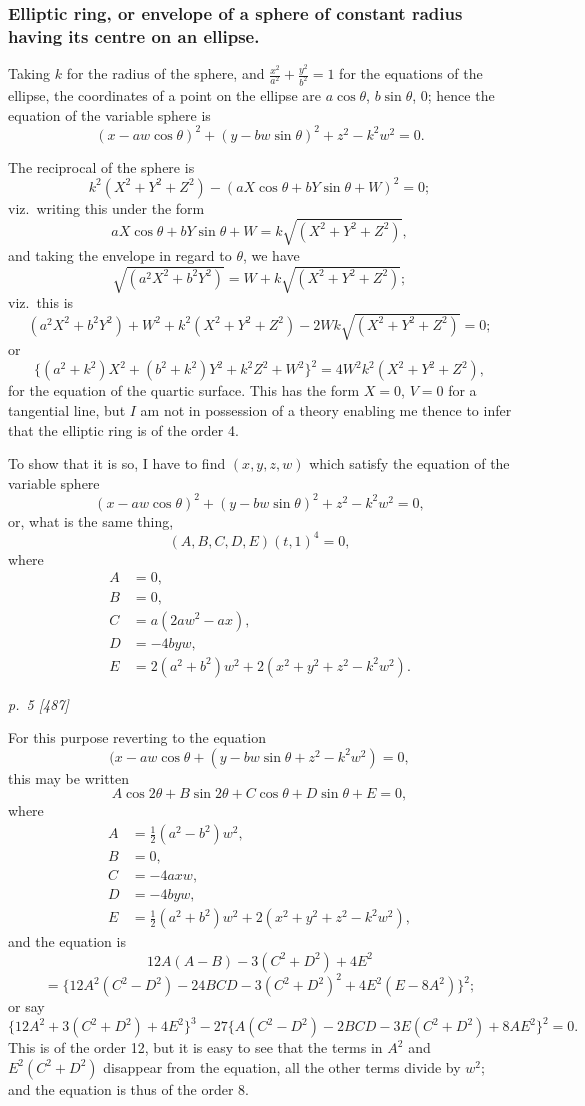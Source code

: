 \documentclass[11pt,a4paper]{article}
\theoremstyle{plain}
\theoremstyle{definition}
\begin{document}
\subsubsection*{Elliptic ring, or envelope of a sphere of constant radius having its centre on an ellipse.}

Taking $k$ for the radius of the sphere, and $\frac{x^2}{a^2} + \frac{y^2}{b^2} = 1$ for the equations of
the ellipse, the coordinates of a point on the ellipse are $a\cos\theta$, $b\sin\theta$, $0$; hence the
equation of the variable sphere is
\[
(x - aw\cos\theta)^2 + (y - bw\sin\theta)^2 + z^2 - k^2 w^2 = 0.
\]

The reciprocal of the sphere is
\[
k^2 (X^2 + Y^2 + Z^2) - (aX\cos\theta + bY\sin\theta + W)^2 = 0;
\]
viz.\ writing this under the form
\[
aX\cos\theta + bY\sin\theta + W = k\sqrt{(X^2 + Y^2 + Z^2)},
\]
and taking the envelope in regard to $\theta$, we have
\[
\sqrt{(a^2X^2 + b^2Y^2)} = W + k\sqrt{(X^2 + Y^2 + Z^2)};
\]
viz.\ this is
\[
(a^2X^2 + b^2Y^2) + W^2 + k^2(X^2 + Y^2 + Z^2) - 2W k \sqrt{(X^2 + Y^2 + Z^2)} = 0;
\]
or
\[
\{(a^2 + k^2)X^2 + (b^2 + k^2)Y^2 + k^2 Z^2 + W^2\}^2 = 4W^2 k^2 (X^2 + Y^2 + Z^2),
\]
for the equation of the quartic surface.  This has the form $X = 0$, $V = 0$ for a tangential
line, but $I$ am not in possession of a theory enabling me thence to infer that the
elliptic ring is of the order 4.

To show that it is so, I have to find $(x, y, z, w)$ which satisfy the equation
of the variable sphere
\[
(x - aw\cos\theta)^2 + (y - bw\sin\theta)^2 + z^2 - k^2 w^2 = 0,
\]
or, what is the same thing,
\[
(A, B, C, D, E)(t, 1)^4 = 0,
\]
where
\begin{align*}
A &= 0, \\
B &= 0, \\
C &= a(2aw^2 - ax), \\
D &= -4 byw, \\
E &= 2(a^2 + b^2)w^2 + 2(x^2 + y^2 + z^2 - k^2 w^2).
\end{align*}

\clearpage

\bigskip
\textit{p.~5 [487]}
\smallskip

For this purpose reverting to the equation
\[
(x - aw\cos\theta + (y - bw\sin\theta + z^2 - k^2 w^2) = 0,
\]
this may be written
\[
A \cos 2\theta + B \sin 2\theta + C \cos \theta + D \sin \theta + E = 0,
\]
where
\begin{align*}
A &= \tfrac{1}{2}(a^2 - b^2)w^2, \\
B &= 0, \\
C &= -4axw, \\
D &= -4byw, \\
E &= \tfrac{1}{2}(a^2 + b^2)w^2 + 2(x^2 + y^2 + z^2 - k^2 w^2),
\end{align*}
and the equation is
\[
12A(A - B) - 3(C^2 + D^2) + 4E^2
\]
\[
= \{12A^2(C^2 - D^2) - 24BCD - 3(C^2 + D^2)^2 + 4E^2(E - 8A^2)\}^2;
\]
or say
\[
\{12A^2 + 3(C^2 + D^2) + 4E^2\}^3 - 27\{A(C^2 - D^2) - 2BCD - 3E(C^2 + D^2) + 8AE^2\}^2 = 0.
\]
This is of the order 12, but it is easy to see that the terms in $A^2$ and $E^2 (C^2 + D^2)$
disappear from the equation, all the other terms divide by $w^2$; and the equation is
thus of the order 8.
\end{document}
